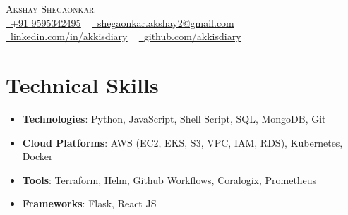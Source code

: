 \documentclass[letterpaper,11pt]{article}
\newcommand{\resumeItem}[1]{
    \item
        \small{#1}
}
\newcommand{\resumeItemListStart}{\begin{itemize}}
\newcommand{\resumeItemListEnd}{\end{itemize}}
\begin{document}
\begin{center}
    {\Huge\scshape Akshay Shegaonkar} \\ \vspace{1pt}
    \href{tel:+919595342495}{\raisebox{-0.2\height}\faPhone\ \underline{+91 9595342495}} ~
    \href{mailto:shegaonkar.akshay2@gmail.com}{\raisebox{-0.2\height}\faEnvelope\  \underline{shegaonkar.akshay2@gmail.com}} ~
    \href{https://www.linkedin.com/in/akkisdiary/}{\raisebox{-0.2\height}\faLinkedin\ \underline{linkedin.com/in/akkisdiary}} ~
    \href{https://github.com/akkisdiary}{\raisebox{-0.2\height}\faGithub\ \underline{github.com/akkisdiary}}
\end{center}

\section{Technical Skills}
\resumeItemListStart
    \resumeItem
    {\textbf{Technologies}: Python, JavaScript, Shell Script, SQL, MongoDB, Git}
    \resumeItem
    {\textbf{Cloud Platforms}: AWS (EC2, EKS, S3, VPC, IAM, RDS), Kubernetes, Docker}
    \resumeItem
    {\textbf{Tools}: Terraform, Helm, Github Workflows, Coralogix, Prometheus}
    \resumeItem
    {\textbf{Frameworks}: Flask, React JS}
\resumeItemListEnd


\end{document}

